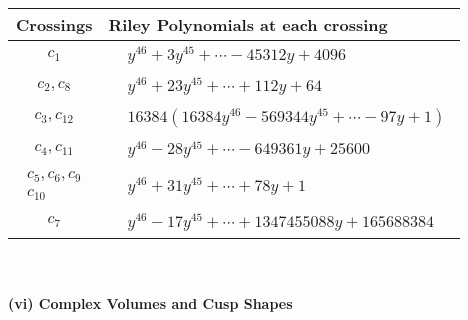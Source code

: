 \documentclass[1p]{elsarticle_modified}
\theoremstyle{definition}
\begin{document}
\begin{tabular}{m{50pt}|m{274pt}}
Crossings & \hspace{64pt}Riley Polynomials at each crossing \\
\hline $$\begin{aligned}c_{1}\end{aligned}$$&$\begin{aligned}
&y^{46}+3 y^{45}+\cdots-45312 y+4096
\end{aligned}$\\
\hline $$\begin{aligned}c_{2},c_{8}\end{aligned}$$&$\begin{aligned}
&y^{46}+23 y^{45}+\cdots+112 y+64
\end{aligned}$\\
\hline $$\begin{aligned}c_{3},c_{12}\end{aligned}$$&$\begin{aligned}
&16384(16384 y^{46}-569344 y^{45}+\cdots-97 y+1)
\end{aligned}$\\
\hline $$\begin{aligned}c_{4},c_{11}\end{aligned}$$&$\begin{aligned}
&y^{46}-28 y^{45}+\cdots-649361 y+25600
\end{aligned}$\\
\hline $$\begin{aligned}c_{5},c_{6},c_{9}\\c_{10}\end{aligned}$$&$\begin{aligned}
&y^{46}+31 y^{45}+\cdots+78 y+1
\end{aligned}$\\
\hline $$\begin{aligned}c_{7}\end{aligned}$$&$\begin{aligned}
&y^{46}-17 y^{45}+\cdots+1347455088 y+165688384
\end{aligned}$\\
\hline
\end{tabular}\\~\\
\newpage\flushleft \textbf{(vi) Complex Volumes and Cusp Shapes}
\end{document}
